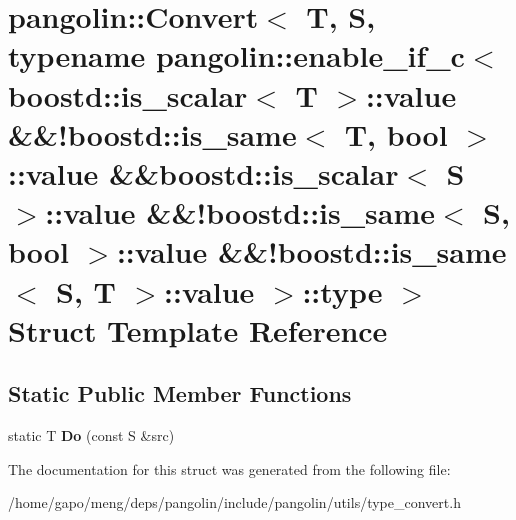 \hypertarget{structpangolin_1_1_convert_3_01_t_00_01_s_00_01typename_01pangolin_1_1enable__if__c_3_01boostd_15bb04e576c082ab636857abc71178db4}{}\section{pangolin\+:\+:Convert$<$ T, S, typename pangolin\+:\+:enable\+\_\+if\+\_\+c$<$ boostd\+:\+:is\+\_\+scalar$<$ T $>$\+:\+:value \&\&!boostd\+:\+:is\+\_\+same$<$ T, bool $>$\+:\+:value \&\&boostd\+:\+:is\+\_\+scalar$<$ S $>$\+:\+:value \&\&!boostd\+:\+:is\+\_\+same$<$ S, bool $>$\+:\+:value \&\&!boostd\+:\+:is\+\_\+same$<$ S, T $>$\+:\+:value $>$\+:\+:type $>$ Struct Template Reference}
\label{structpangolin_1_1_convert_3_01_t_00_01_s_00_01typename_01pangolin_1_1enable__if__c_3_01boostd_15bb04e576c082ab636857abc71178db4}
\subsection*{Static Public Member Functions}
\begin{DoxyCompactItemize}
\item 
static T {\bfseries Do} (const S \&src)\hypertarget{structpangolin_1_1_convert_3_01_t_00_01_s_00_01typename_01pangolin_1_1enable__if__c_3_01boostd_15bb04e576c082ab636857abc71178db4_a8972f65a05af676f29c83038f7016c4a}{}\label{structpangolin_1_1_convert_3_01_t_00_01_s_00_01typename_01pangolin_1_1enable__if__c_3_01boostd_15bb04e576c082ab636857abc71178db4_a8972f65a05af676f29c83038f7016c4a}

\end{DoxyCompactItemize}


The documentation for this struct was generated from the following file\+:\begin{DoxyCompactItemize}
\item 
/home/gapo/meng/deps/pangolin/include/pangolin/utils/type\+\_\+convert.\+h\end{DoxyCompactItemize}
